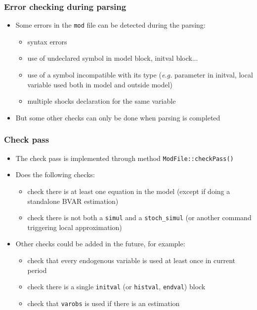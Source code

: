 \documentclass{beamer}
\begin{document}
\begin{frame}
  \frametitle{Error checking during parsing}
  \begin{itemize}
  \item Some errors in the \texttt{mod} file can be detected during the parsing:
    \begin{itemize}
    \item syntax errors
    \item use of undeclared symbol in model block, initval block...
    \item use of a symbol incompatible with its type (\textit{e.g.} parameter in initval, local variable used both in model and outside model)
    \item multiple shocks declaration for the same variable
    \end{itemize}
  \item But some other checks can only be done when parsing is completed
  \end{itemize}
\end{frame}

\begin{frame}
  \frametitle{Check pass}
  \begin{itemize}
  \item The check pass is implemented through method \texttt{ModFile::checkPass()}
  \item Does the following checks:
    \begin{itemize}
    \item check there is at least one equation in the model (except if doing a standalone BVAR estimation)
    \item check there is not both a \texttt{simul} and a \texttt{stoch\_simul} (or another command triggering local approximation)
    \end{itemize}
  \item Other checks could be added in the future, for example:
    \begin{itemize}
    \item check that every endogenous variable is used at least once in current period
    \item check there is a single \texttt{initval} (or \texttt{histval}, \texttt{endval}) block
    \item check that \texttt{varobs} is used if there is an estimation
    \end{itemize}
  \end{itemize}
\end{frame}
\end{document}
